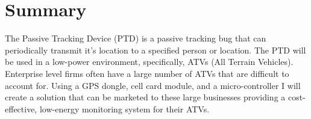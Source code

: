 \documentclass[11pt]{article}
\begin{document}
% 
%
%


\thispagestyle{empty}
\tableofcontents
\vspace{2cm}

\thispagestyle{empty}
\listoffigures
\pagebreak


\section{Summary}
The Passive Tracking Device (PTD) is a passive tracking bug that can periodically transmit it’s location to a specified person or location. 
The PTD will be used in a low-power environment, specifically, ATVs (All Terrain Vehicles). Enterprise level firms often have a large number 
of ATVs that are 
difficult to account for. Using a GPS dongle, cell card module, and a micro-controller I will create a solution that can be marketed to 
these large businesses providing a cost-effective, low-energy monitoring system for their ATVs.
\end{document}
